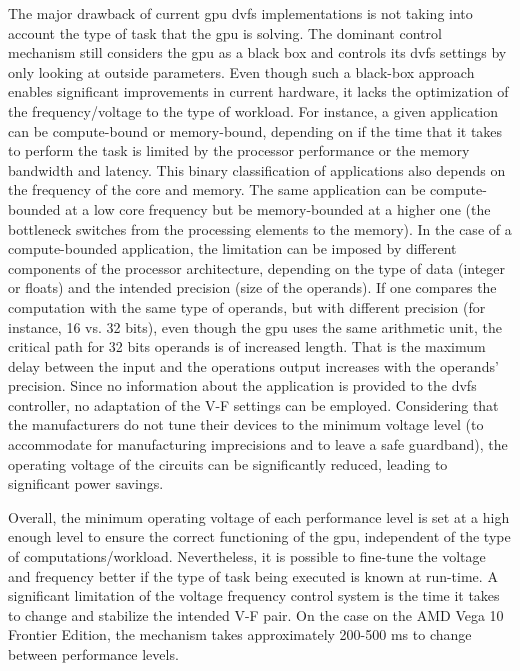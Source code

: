 The major drawback of current \acrshort{gpu} \acrshort{dvfs} implementations is not taking into account the type of task that the \acrshort{gpu} is solving. The dominant control mechanism still considers the \acrshort{gpu} as a black box and controls its \acrshort{dvfs} settings by only looking at outside parameters. Even though such a black-box approach enables significant improvements in current hardware, it lacks the optimization of the frequency/voltage to the type of workload. For instance, a given application can be compute-bound or memory-bound, depending on if the time that it takes to perform the task is limited by the processor performance or the memory bandwidth and latency. This binary classification of applications also depends on the frequency of the core and memory. The same application can be compute-bounded at a low core frequency but be memory-bounded at a higher one \cite{guerreiro_dvfs-aware_2019} (the bottleneck switches from the processing elements to the memory). In the case of a compute-bounded application, the limitation can be imposed by different components of the processor architecture, depending on the type of data (integer or floats) and the intended precision (size of the operands). If one compares the computation with the same type of operands, but with different precision (for instance, 16 vs. 32 bits), even though the \acrshort{gpu} uses the same arithmetic unit, the critical path for 32 bits operands is of increased length. That is the maximum delay between the input and the operations output increases with the operands' precision. 
Since no information about the application is provided to the \acrshort{dvfs} controller, no adaptation of the V-F settings can be employed.
Considering that the manufacturers do not tune their devices to the minimum voltage level (to accommodate for manufacturing imprecisions and to leave a safe guardband), the operating voltage of the circuits can be significantly reduced, leading to significant power savings. 

Overall, the minimum operating voltage of each performance level is set at a high enough level to ensure the correct functioning of the \acrshort{gpu}, independent of the type of computations/workload. Nevertheless, it is possible to fine-tune the voltage and frequency better if the type of task being executed is known at run-time. A significant limitation of the voltage frequency control system is the time it takes to change and stabilize the intended V-F pair. On the case on the AMD Vega 10 Frontier Edition, the mechanism takes approximately 200-500 ms to change between performance levels.

